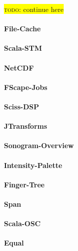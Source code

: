 \documentclass[11pt,a4paper]{article}
\newcommand{\todo}[1]{\colorbox{yellow}{\textsc{todo}: #1}}
\begin{document}
\todo{continue here}

\paragraph{File-Cache}

\paragraph{Scala-STM}

\paragraph{NetCDF}

\paragraph{FScape-Jobs}

\paragraph{Sciss-DSP}

\paragraph{JTransforms}

\paragraph{Sonogram-Overview}

\paragraph{Intensity-Palette}

\paragraph{Finger-Tree}

\paragraph{Span}

\paragraph{Scala-OSC}

\paragraph{Equal}
\end{document}
